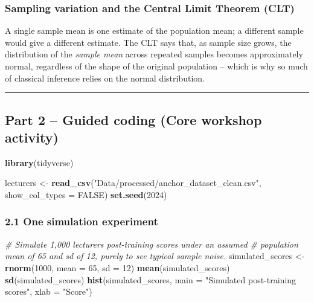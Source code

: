 \documentclass[11pt]{article}
\newenvironment{Shaded}{\begin{snugshade}}{\end{snugshade}}
\newcommand{\AttributeTok}[1]{\textcolor[rgb]{0.13,0.29,0.53}{#1}}
\newcommand{\CommentTok}[1]{\textcolor[rgb]{0.56,0.35,0.01}{\textit{#1}}}
\newcommand{\ConstantTok}[1]{\textcolor[rgb]{0.56,0.35,0.01}{#1}}
\newcommand{\DecValTok}[1]{\textcolor[rgb]{0.00,0.00,0.81}{#1}}
\newcommand{\FunctionTok}[1]{\textcolor[rgb]{0.13,0.29,0.53}{\textbf{#1}}}
\newcommand{\NormalTok}[1]{#1}
\newcommand{\OtherTok}[1]{\textcolor[rgb]{0.56,0.35,0.01}{#1}}
\newcommand{\StringTok}[1]{\textcolor[rgb]{0.31,0.60,0.02}{#1}}
\begin{document}
\hypertarget{sampling-variation-and-the-central-limit-theorem-clt}{%
\subsubsection{Sampling variation and the Central Limit Theorem
(CLT)}\label{sampling-variation-and-the-central-limit-theorem-clt}}

A single sample mean is one estimate of the population mean; a different
sample would give a different estimate. The CLT says that, as sample
size grows, the distribution of the \emph{sample mean} across repeated
samples becomes approximately normal, regardless of the shape of the
original population -- which is why so much of classical inference
relies on the normal distribution.

\begin{center}\rule{0.5\linewidth}{0.5pt}\end{center}

\hypertarget{part-2-guided-coding-core-workshop-activity}{%
\subsection{Part 2 -- Guided coding (Core workshop
activity)}\label{part-2-guided-coding-core-workshop-activity}}

\begin{Shaded}
\begin{Highlighting}[]
\FunctionTok{library}\NormalTok{(tidyverse)}

\NormalTok{lecturers }\OtherTok{\textless{}{-}} \FunctionTok{read\_csv}\NormalTok{(}\StringTok{"Data/processed/anchor\_dataset\_clean.csv"}\NormalTok{, }\AttributeTok{show\_col\_types =} \ConstantTok{FALSE}\NormalTok{)}
\FunctionTok{set.seed}\NormalTok{(}\DecValTok{2024}\NormalTok{)}
\end{Highlighting}
\end{Shaded}

\hypertarget{one-simulation-experiment}{%
\subsubsection{2.1 One simulation
experiment}\label{one-simulation-experiment}}

\begin{Shaded}
\begin{Highlighting}[]
\CommentTok{\# Simulate 1,000 lecturers\textquotesingle{} post{-}training scores under an assumed}
\CommentTok{\# population mean of 65 and sd of 12, purely to see typical sample noise.}
\NormalTok{simulated\_scores }\OtherTok{\textless{}{-}} \FunctionTok{rnorm}\NormalTok{(}\DecValTok{1000}\NormalTok{, }\AttributeTok{mean =} \DecValTok{65}\NormalTok{, }\AttributeTok{sd =} \DecValTok{12}\NormalTok{)}
\FunctionTok{mean}\NormalTok{(simulated\_scores)}
\FunctionTok{sd}\NormalTok{(simulated\_scores)}
\FunctionTok{hist}\NormalTok{(simulated\_scores, }\AttributeTok{main =} \StringTok{"Simulated post{-}training scores"}\NormalTok{, }\AttributeTok{xlab =} \StringTok{"Score"}\NormalTok{)}
\end{Highlighting}
\end{Shaded}
\end{document}
